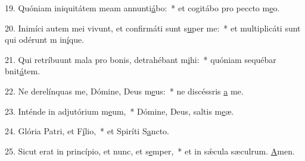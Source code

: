 19. Quóniam iniquitátem meam annunti\uline{á}bo:~* et cogitábo pro peccto m\uline{e}o.\par 
20. Inimíci autem mei vivunt, et confirmáti sunt s\uline{u}per me:~* et multiplicáti sunt qui odérunt m in\uline{í}que.\par 
21. Qui retríbuunt mala pro bonis, detrahébant m\uline{i}hi:~* quóniam sequébar bnit\uline{á}tem.\par 
22. Ne derelínquas me, Dómine, Deus m\uline{e}us:~* ne discéssris \uline{a} me.\par 
23. Inténde in adjutórium m\uline{e}um,~* Dómine, Deus, saltis m\uline{e}æ.\par 
24. Glória Patri, et F\uline{í}lio,~* et Spiríti S\uline{a}ncto.\par 
25. Sicut erat in princípio, et nunc, et s\uline{e}mper,~* et in sǽcula sæculrum. \uline{A}men.\par 
